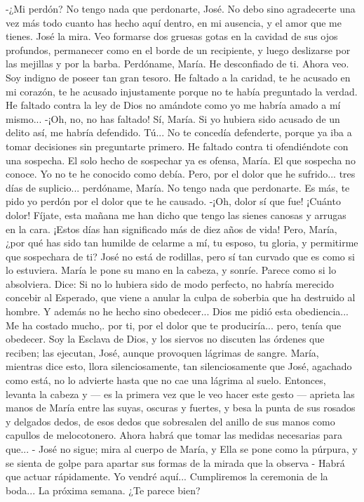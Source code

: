 \documentclass[12pt]{book} %
\begin{document}
-¿Mi perdón? No tengo nada que perdonarte, José. No debo sino agradecerte una vez más todo cuanto has hecho aquí 
dentro, en mi ausencia, y el amor que me tienes. 
José la mira. Veo formarse dos gruesas gotas en la cavidad de sus ojos profundos, permanecer como en el borde de un 
recipiente, y luego deslizarse por las mejillas y por la barba. 
Perdóname, María. He desconfiado de ti. Ahora veo. Soy indigno de poseer tan gran tesoro. He faltado a la caridad, te he acusado en mi corazón, te he acusado injustamente porque no te había preguntado la verdad. He faltado contra la ley de Dios no amándote como yo me habría amado a mí mismo... 
-¡Oh, no, no has faltado! 
Sí, María. Si yo hubiera sido acusado de un delito así, me habría defendido. Tú... No te concedía defenderte, porque ya 
iba a tomar decisiones sin preguntarte primero. He faltado contra ti ofendiéndote con una sospecha. El solo hecho de sospechar ya es ofensa, María. El que sospecha no conoce. Yo no te he conocido como debía. Pero, por el dolor que he sufrido... tres días de suplicio... perdóname, María. 
No tengo nada que perdonarte. Es más, te pido yo perdón por el dolor que te he causado. 
-¡Oh, dolor sí que fue! ¡Cuánto dolor! Fíjate, esta mañana me han dicho que tengo las sienes canosas y arrugas en la cara. ¡Estos días han significado más de diez años de vida! Pero, María, ¿por qué has sido tan humilde de celarme a mí, tu esposo, tu gloria, y permitirme que sospechara de ti?                     
José no está de rodillas, pero sí tan curvado que es como si lo estuviera. María le pone su mano en la cabeza, y sonríe. 
Parece como si lo absolviera. Dice: 
Si no lo hubiera sido de modo perfecto, no habría merecido concebir al Esperado, que viene a anular la culpa de soberbia que ha destruido al hombre. Y además no he hecho sino obedecer... Dios me pidió esta obediencia... Me ha costado mucho,. por ti, por el dolor que te produciría... pero, tenía que obedecer. Soy la Esclava de Dios, y los siervos no discuten las órdenes que reciben; las ejecutan, José, aunque provoquen lágrimas de sangre. 
María, mientras dice esto, llora silenciosamente, tan silenciosamente que José, agachado como está, no lo advierte 
hasta que no cae una lágrima al suelo. Entonces, levanta la cabeza y — es la primera vez que le veo hacer este gesto — aprieta las manos de María entre  las suyas, oscuras y fuertes, y besa la punta de sus rosados y delgados dedos, de esos dedos que sobresalen del anillo de sus manos como capullos de melocotonero. 
Ahora habrá que tomar las medidas necesarias para que... - José no sigue; mira al cuerpo de María, y Ella se pone como la púrpura, y se sienta de golpe para apartar sus formas de la mirada que la observa - Habrá que actuar rápidamente. Yo vendré aquí... Cumpliremos la ceremonia de la boda... La próxima semana. ¿Te parece bien? 
\end{document}
